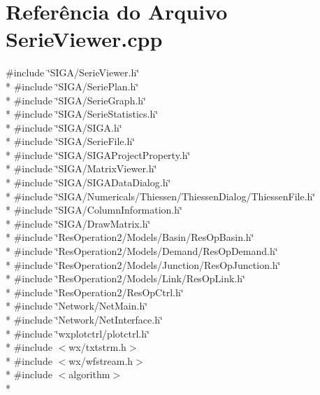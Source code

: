 \section{Referência do Arquivo Serie\+Viewer.\+cpp}
\label{_serie_viewer_8cpp}
{\ttfamily \#include \char`\"{}S\+I\+G\+A/\+Serie\+Viewer.\+h\char`\"{}}\\*
{\ttfamily \#include \char`\"{}S\+I\+G\+A/\+Serie\+Plan.\+h\char`\"{}}\\*
{\ttfamily \#include \char`\"{}S\+I\+G\+A/\+Serie\+Graph.\+h\char`\"{}}\\*
{\ttfamily \#include \char`\"{}S\+I\+G\+A/\+Serie\+Statistics.\+h\char`\"{}}\\*
{\ttfamily \#include \char`\"{}S\+I\+G\+A/\+S\+I\+G\+A.\+h\char`\"{}}\\*
{\ttfamily \#include \char`\"{}S\+I\+G\+A/\+Serie\+File.\+h\char`\"{}}\\*
{\ttfamily \#include \char`\"{}S\+I\+G\+A/\+S\+I\+G\+A\+Project\+Property.\+h\char`\"{}}\\*
{\ttfamily \#include \char`\"{}S\+I\+G\+A/\+Matrix\+Viewer.\+h\char`\"{}}\\*
{\ttfamily \#include \char`\"{}S\+I\+G\+A/\+S\+I\+G\+A\+Data\+Dialog.\+h\char`\"{}}\\*
{\ttfamily \#include \char`\"{}S\+I\+G\+A/\+Numericals/\+Thiessen/\+Thiessen\+Dialog/\+Thiessen\+File.\+h\char`\"{}}\\*
{\ttfamily \#include \char`\"{}S\+I\+G\+A/\+Column\+Information.\+h\char`\"{}}\\*
{\ttfamily \#include \char`\"{}S\+I\+G\+A/\+Draw\+Matrix.\+h\char`\"{}}\\*
{\ttfamily \#include \char`\"{}Res\+Operation2/\+Models/\+Basin/\+Res\+Op\+Basin.\+h\char`\"{}}\\*
{\ttfamily \#include \char`\"{}Res\+Operation2/\+Models/\+Demand/\+Res\+Op\+Demand.\+h\char`\"{}}\\*
{\ttfamily \#include \char`\"{}Res\+Operation2/\+Models/\+Junction/\+Res\+Op\+Junction.\+h\char`\"{}}\\*
{\ttfamily \#include \char`\"{}Res\+Operation2/\+Models/\+Link/\+Res\+Op\+Link.\+h\char`\"{}}\\*
{\ttfamily \#include \char`\"{}Res\+Operation2/\+Res\+Op\+Ctrl.\+h\char`\"{}}\\*
{\ttfamily \#include \char`\"{}Network/\+Net\+Main.\+h\char`\"{}}\\*
{\ttfamily \#include \char`\"{}Network/\+Net\+Interface.\+h\char`\"{}}\\*
{\ttfamily \#include \char`\"{}wxplotctrl/plotctrl.\+h\char`\"{}}\\*
{\ttfamily \#include $<$wx/txtstrm.\+h$>$}\\*
{\ttfamily \#include $<$wx/wfstream.\+h$>$}\\*
{\ttfamily \#include $<$algorithm$>$}\\*

